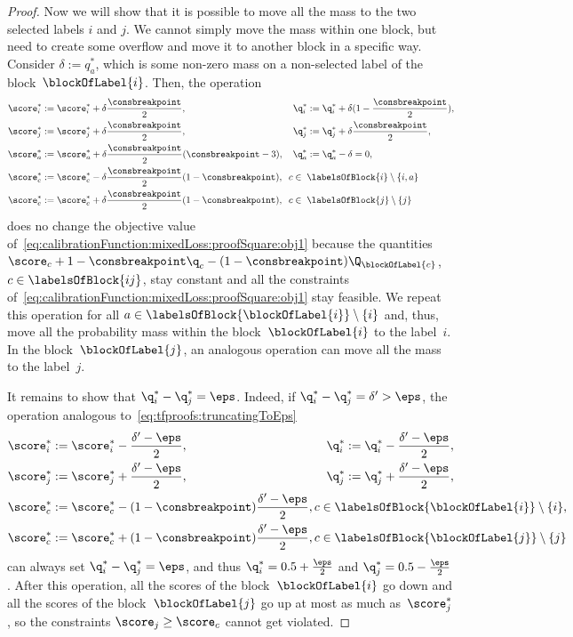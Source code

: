 \documentclass{article}
\begin{document}
\begin{proof}
    Now we will show that it is possible to move all the mass to the two selected labels $i$ and $j$.
    We cannot simply move the mass within one block, but need to create some overflow and move it to another block in a specific way.
    Consider $\delta:=q_a^*$, which is some non-zero mass on a non-selected label of the block~$\blockOfLabel{i}$.
    Then, the operation
    \begin{align*}
    \score_i^* &:= \score_i^* + \delta\frac{\consbreakpoint}{2}, &
    \q_i^* &:= \q_i^* + \delta(1-\frac{\consbreakpoint}{2}), \\
    \score_j^* &:= \score_j^* + \delta\frac{\consbreakpoint}{2}, &
    \q_{j}^* &:= \q_{j}^* + \delta\frac{\consbreakpoint}{2},\\
    \score_a^* &:= \score_a^* + \delta\frac{\consbreakpoint}{2}(\consbreakpoint - 3), &
    \q_{a}^* &:= \q_{a}^* - \delta = 0,\\
    \score_c^* &:= \score_c^* - \delta\frac{\consbreakpoint}{2} (1-\consbreakpoint), \mathrlap{\;\;c \in \;\labelsOfBlock{i} \setminus \{i,a\}} &&\\
    \score_c^* &:= \score_c^* +  \delta\frac{\consbreakpoint}{2}(1-\consbreakpoint), \mathrlap{\;\;c \in \;\labelsOfBlock{j} \setminus \{j\}} &&
    \end{align*}
    does no change the objective value of~\eqref{eq:calibrationFunction:mixedLoss:proofSquare:obj1} because the quantities $\score_c + 1 -  \consbreakpoint \q_c - (1-\consbreakpoint)\Q_{\blockOfLabel{c}}$, $c \in \labelsOfBlock{ij}$, stay constant and all the constraints of~\eqref{eq:calibrationFunction:mixedLoss:proofSquare:obj1} stay feasible.
    We repeat this operation for all $a \in \labelsOfBlock{\blockOfLabel{i}}\setminus \{i\}$ and, thus, move all the probability mass within the block~$\blockOfLabel{i}$ to the label~$i$.
    In the block~$\blockOfLabel{j}$, an analogous operation can move all the mass to the label~$j$.
    
    It remains to show that $\q_i^* - \q_j^* = \eps$.
    Indeed, if $\q^*_i - \q^*_j = \delta' >  \eps$, the operation analogous to~\eqref{eq:tfproofs:truncatingToEps}
    \begin{align*}
    \score_i^* &:= \score_i^* - \frac{\delta'-\eps}{2}, &
    \q_i^* &:= \q_i^* - \frac{\delta'-\eps}{2}, \\
    \score_j^* &:= \score_j^* + \frac{\delta'-\eps}{2},&
    \q_{j}^* &:= \q_{j}^* + \frac{\delta'-\eps}{2}, \\
    \score_c^* &:= \score_c^* - (1-\consbreakpoint)\frac{\delta'-\eps}{2}, \mathrlap{c \in  \labelsOfBlock{\blockOfLabel{i}}\setminus \{i\},} \\
    \score_c^* &:= \score_c^* + (1-\consbreakpoint)\frac{\delta'-\eps}{2}, \mathrlap{c \in \labelsOfBlock{\blockOfLabel{j}}\setminus \{j\}}
    \end{align*}
    can always set  $\q_i^* - \q_j^* = \eps$, and thus  $\q^*_i = 0.5 + \frac{\eps}{2}$ and $\q^*_{j} = 0.5 - \frac{\eps}{2}$.
    After this operation, all the scores of the block~$\blockOfLabel{i}$ go down and all the scores of the block~$\blockOfLabel{j}$ go up at most as much as~$\score_j^*$, so the constraints $\score_{j} \geq \score_c$ cannot get violated.
    

\end{proof}
\end{document}
